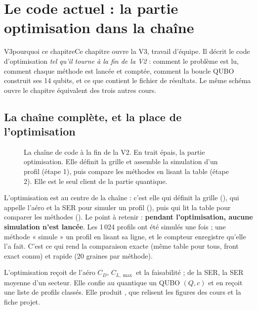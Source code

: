 \chapter{Le code actuel : la partie optimisation dans la chaîne}\label{ch:code-actuel}


\begin{evolution}{V3}{pourquoi ce chapitre}Ce chapitre ouvre la V3, travail d'équipe. Il décrit le code d'optimisation \emph{tel qu'il tourne à la fin de la V2} : comment le problème est lu, comment chaque méthode est lancée et comptée, comment la boucle QUBO construit ses 14 qubits, et ce que contient le fichier de résultats. Le même schéma ouvre le chapitre équivalent des trois autres cours.\end{evolution}

\section{La chaîne complète, et la place de l'optimisation}
\begin{figure}[htbp]
\centering
{}
\caption{La chaîne de code à la fin de la V2. En trait épais, la partie optimisation. Elle définit la grille et assemble la simulation d'un profil (étape 1), puis compare les méthodes en lisant la table (étape 2). Elle est le seul client de la partie quantique.}\label{fig:chaine-optim}
\end{figure}

L'optimisation est au centre de la chaîne : c'est elle qui définit la grille (), qui appelle l'aéro et la SER pour simuler un profil (), puis qui lit la table pour comparer les méthodes (). Le point à retenir : \textbf{pendant l'optimisation, aucune simulation n'est lancée}. Les 1\,024 profils ont été simulés une fois ; une méthode « simule » un profil en lisant sa ligne, et le compteur enregistre qu'elle l'a fait. C'est ce qui rend la comparaison exacte (même table pour tous, front exact connu) et rapide (20 graines par méthode).

\begin{projet}
L'optimisation reçoit de l'aéro $C_D$, $C_{L,\max}$ et la faisabilité ; de la SER, la SER moyenne d'un secteur. Elle confie au quantique un QUBO $(Q,c)$ et en reçoit une liste de profils classés. Elle produit , que relisent les figures des cours et la fiche projet.
\end{projet}

